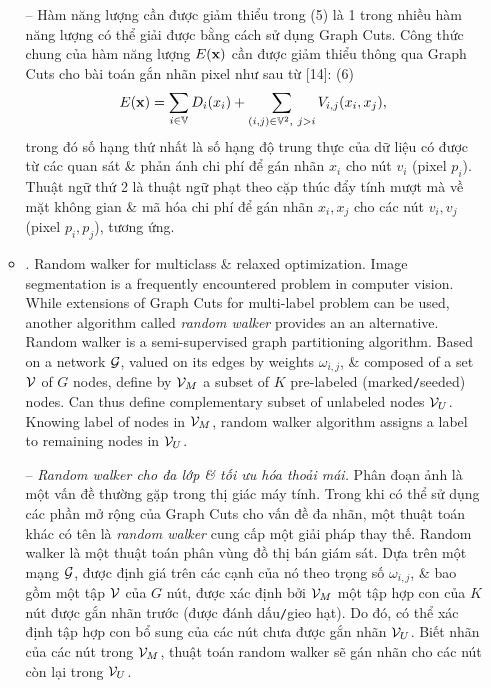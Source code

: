 \documentclass{article}
\begin{document}
\begin{itemize}
\begin{itemize}
        -- Hàm năng lượng cần được giảm thiểu trong (5) là 1 trong nhiều hàm năng lượng có thể giải được bằng cách sử dụng Graph Cuts. Công thức chung của hàm năng lượng $E({\bf x})$ cần được giảm thiểu thông qua Graph Cuts cho bài toán gắn nhãn pixel như sau từ [14]: (6)
        \begin{equation*}
            E({\bf x}) = \sum_{i\in\mathbb{V}} D_i(x_i) + \sum_{(i,j)\in\mathbb{V}^2,\ j > i} V_{i,j}(x_i,x_j),
        \end{equation*}
        trong đó số hạng thứ nhất là số hạng độ trung thực của dữ liệu có được từ các quan sát \& phản ánh chi phí để gán nhãn $x_i$ cho nút $v_i$ (pixel $p_i$). Thuật ngữ thứ 2 là thuật ngữ phạt theo cặp thúc đẩy tính mượt mà về mặt không gian \& mã hóa chi phí để gán nhãn $x_i,x_j$ cho các nút $v_i,v_j$ (pixel $p_i,p_j$), tương ứng.
        \item {. Random walker for multiclass \& relaxed optimization.} Image segmentation is a frequently encountered problem in computer vision. While extensions of Graph Cuts for multi-label problem can be used, another algorithm called {\it random walker} provides an an alternative. Random walker is a semi-supervised graph partitioning algorithm. Based on a network ${\cal G}$, valued on its edges by weights $\omega_{i,j}$, \& composed of a set ${\cal V}$ of $G$ nodes, define by ${\cal V}_M$ a subset of $K$ pre-labeled (marked{\tt/}seeded) nodes. Can thus define complementary subset of unlabeled nodes ${\cal V}_U$. Knowing label of nodes in ${\cal V}_M$, random walker algorithm assigns a label to remaining nodes in ${\cal V}_U$.
        
        -- {\it Random walker cho đa lớp \& tối ưu hóa thoải mái.} Phân đoạn ảnh là một vấn đề thường gặp trong thị giác máy tính. Trong khi có thể sử dụng các phần mở rộng của Graph Cuts cho vấn đề đa nhãn, một thuật toán khác có tên là {\it random walker} cung cấp một giải pháp thay thế. Random walker là một thuật toán phân vùng đồ thị bán giám sát. Dựa trên một mạng ${\cal G}$, được định giá trên các cạnh của nó theo trọng số $\omega_{i,j}$, \& bao gồm một tập ${\cal V}$ của $G$ nút, được xác định bởi ${\cal V}_M$ một tập hợp con của $K$ nút được gắn nhãn trước (được đánh dấu{\tt/}gieo hạt). Do đó, có thể xác định tập hợp con bổ sung của các nút chưa được gắn nhãn ${\cal V}_U$. Biết nhãn của các nút trong ${\cal V}_M$, thuật toán random walker sẽ gán nhãn cho các nút còn lại trong ${\cal V}_U$.
        

\end{itemize}
\end{itemize}
\end{document}
